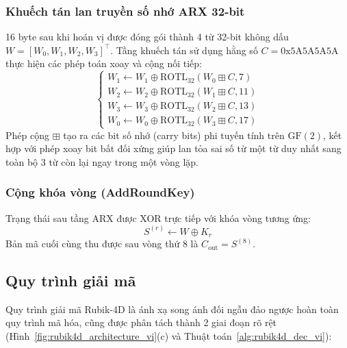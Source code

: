\documentclass[10pt,twocolumn]{article}
\begin{document}
\subsubsection{Khuếch tán lan truyền số nhớ ARX 32-bit}
16 byte sau khi hoán vị được đóng gói thành 4 từ 32-bit không dấu $W = [W_0, W_1, W_2, W_3]^\top$. Tầng khuếch tán sử dụng hằng số $C = \text{0x5A5A5A5A}$ thực hiện các phép toán xoay và cộng nối tiếp:
\begin{equation}
\begin{cases}
    W_1 \leftarrow W_1 \oplus \text{ROTL}_{32}(W_0 \boxplus C, 7) \\
    W_2 \leftarrow W_2 \oplus \text{ROTL}_{32}(W_1 \boxplus C, 11) \\
    W_3 \leftarrow W_3 \oplus \text{ROTL}_{32}(W_2 \boxplus C, 13) \\
    W_0 \leftarrow W_0 \oplus \text{ROTL}_{32}(W_3 \boxplus C, 17)
\end{cases}
\end{equation}
Phép cộng $\boxplus$ tạo ra các bit số nhớ (carry bits) phi tuyến tính trên $\text{GF}(2)$, kết hợp với phép xoay bit bất đối xứng giúp lan tỏa sai số từ một từ duy nhất sang toàn bộ 3 từ còn lại ngay trong một vòng lặp.

\subsubsection{Cộng khóa vòng (AddRoundKey)}
Trạng thái sau tầng ARX được XOR trực tiếp với khóa vòng tương ứng:
\begin{equation}
    S^{(r)} \leftarrow W \oplus K_r
\end{equation}
Bản mã cuối cùng thu được sau vòng thứ 8 là $C_{\text{out}} = S^{(8)}$.

\subsection{Quy trình giải mã}
Quy trình giải mã Rubik-4D là ánh xạ song ánh đối ngẫu đảo ngược hoàn toàn quy trình mã hóa, cũng được phân tách thành 2 giai đoạn rõ rệt (Hình~\ref{fig:rubik4d_architecture_vi}(c) và Thuật toán~\ref{alg:rubik4d_dec_vi}):
\end{document}
